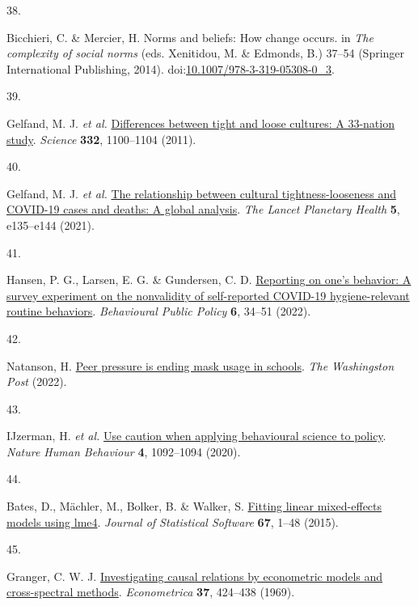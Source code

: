 \documentclass[
  man, donotrepeattitle,floatsintext]{apa6}
\newlength{\cslhangindent}
\newlength{\csllabelwidth}
\newlength{\cslentryspacingunit} %
\newenvironment{CSLReferences}[2] %
 {%
  \setlength{\parindent}{0pt}
  \ifodd #1
  \let\oldpar\par
  \def\par{\hangindent=\cslhangindent\oldpar}
  \fi
  \setlength{\parskip}{#2\cslentryspacingunit}
 }%
 {}
\newcommand{\CSLLeftMargin}[1]{\parbox[t]{\csllabelwidth}{#1}}
\newcommand{\CSLRightInline}[1]{\parbox[t]{\linewidth - \csllabelwidth}{#1}\break}
\begin{document}
\begin{CSLReferences}{0}{0}
\leavevmode{}%
\CSLLeftMargin{38. }%
\CSLRightInline{Bicchieri, C. \& Mercier, H. Norms and beliefs: How change occurs. in \emph{The complexity of social norms} (eds. Xenitidou, M. \& Edmonds, B.) 37--54 (Springer International Publishing, 2014). doi:\href{https://doi.org/10.1007/978-3-319-05308-0_3}{10.1007/978-3-319-05308-0\_3}.}

\leavevmode{}%
\CSLLeftMargin{39. }%
\CSLRightInline{Gelfand, M. J. \emph{et al.} \href{https://doi.org/10.1126/science.1197754}{Differences between tight and loose cultures: A 33-nation study}. \emph{Science} \textbf{332}, 1100--1104 (2011).}

\leavevmode{}%
\CSLLeftMargin{40. }%
\CSLRightInline{Gelfand, M. J. \emph{et al.} \href{https://doi.org/10.1016/S2542-5196(20)30301-6}{The relationship between cultural tightness-looseness and {COVID-19} cases and deaths: A global analysis}. \emph{The Lancet Planetary Health} \textbf{5}, e135--e144 (2021).}

\leavevmode{}%
\CSLLeftMargin{41. }%
\CSLRightInline{Hansen, P. G., Larsen, E. G. \& Gundersen, C. D. \href{https://doi.org/10.1017/bpp.2021.13}{Reporting on one's behavior: A survey experiment on the nonvalidity of self-reported {COVID-19} hygiene-relevant routine behaviors}. \emph{Behavioural Public Policy} \textbf{6}, 34--51 (2022).}

\leavevmode{}%
\CSLLeftMargin{42. }%
\CSLRightInline{Natanson, H. \href{https://www.washingtonpost.com/education/2022/02/25/peer-pressure-mask-optional-schools/}{Peer pressure is ending mask usage in schools}. \emph{The Washingston Post} (2022).}

\leavevmode{}%
\CSLLeftMargin{43. }%
\CSLRightInline{IJzerman, H. \emph{et al.} \href{https://doi.org/10.1038/s41562-020-00990-w}{Use caution when applying behavioural science to policy}. \emph{Nature Human Behaviour} \textbf{4}, 1092--1094 (2020).}

\leavevmode{}%
\CSLLeftMargin{44. }%
\CSLRightInline{Bates, D., Mächler, M., Bolker, B. \& Walker, S. \href{https://doi.org/10.18637/jss.v067.i01}{Fitting linear mixed-effects models using lme4}. \emph{Journal of Statistical Software} \textbf{67}, 1--48 (2015).}

\leavevmode{}%
\CSLLeftMargin{45. }%
\CSLRightInline{Granger, C. W. J. \href{https://doi.org/10.2307/1912791}{Investigating causal relations by econometric models and cross-spectral methods}. \emph{Econometrica} \textbf{37}, 424--438 (1969).}


\end{CSLReferences}
\end{document}
